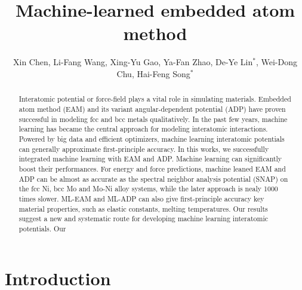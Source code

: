 \documentclass[prb,reprint]{revtex4-2}
\begin{document}
\title{
    Machine-learned embedded atom method
}

\author{Xin Chen, 
        Li-Fang Wang, 
        Xing-Yu Gao,
        Ya-Fan Zhao,
        De-Ye Lin$^\mathrm{*}$, 
        Wei-Dong Chu,
        Hai-Feng Song$^\mathrm{*}$}



% 
%
\begin{abstract}
Interatomic potential or force-field plays a vital role in simulating materials. 
Embedded atom method (EAM) and its variant angular-dependent potential (ADP) 
have proven successful in modeling fcc and bcc metals qualitatively. In the past 
few years, machine learning has became the central approach for modeling 
interatomic interactions. Powered by big data and efficient optimizers, machine 
learning interatomic potentials can generally approximate first-principle 
accuracy. In this works, we successfully integrated machine learning with EAM 
and ADP. Machine learning can significantly boost their performances. 
For energy and force predictions, machine leaned EAM and ADP can be almost 
as accurate as the spectral neighbor analysis potential (SNAP) on the fcc Ni, 
bcc Mo and Mo-Ni alloy systems, while the later approach is nealy 1000 times 
slower. ML-EAM and ML-ADP can also give first-principle accuracy key material 
properties, such as elastic constants, melting temperatures. Our results suggest 
a new and systematic route for developing machine learning interatomic 
potentials. 
Our 
\end{abstract}

\maketitle

% 
%
\section{Introduction}
\label{sec:introduction}
\end{document}
